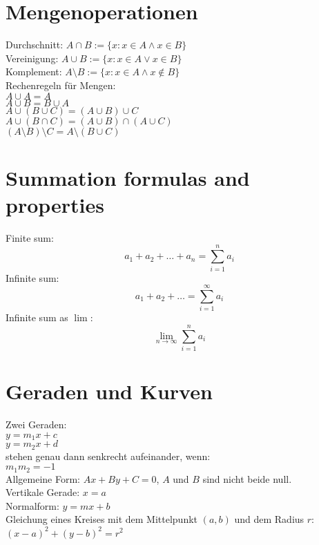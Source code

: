 \documentclass[a4paper, 10pt]{scrartcl}
\begin{document}
\setlength{\parindent}{0em}

\section*{Mengenoperationen}
Durchschnitt: $A\cap B := \{x: x\in A \wedge x\in B\}$\\
Vereinigung: $A\cup B := \{x: x\in A \vee x\in B\}$\\
Komplement: $A\setminus B := \{x: x\in A \wedge x\notin B\}$\\

Rechenregeln für Mengen:\\
$A\cup A = A$\\
$A\cup B = B\cup A$\\
$A\cup (B\cup C) = (A\cup B)\cup C$\\
$A\cup (B\cap C) = (A\cup B)\cap (A\cup C)$\\
$(A\setminus B)\setminus C = A\setminus (B\cup C)$\\

\section*{Summation formulas and properties}
Finite sum:
\[
a_{1} + a_{2} + \dots + a_{n} = \sum_{i=1}^{n}a_{i}
\]
Infinite sum:
\[
a_{1} + a_{2} + \dots = \sum_{i=1}^{\infty}a_{i}
\]
Infinite sum as $\lim$:\\
\[
\lim_{n\to\infty}\sum_{i=1}^{n}a_{i}
\]

\section*{Geraden und Kurven}
Zwei Geraden:\\
$y = m_{1}x + c$\\
$y = m_{2}x + d$\\
stehen genau dann senkrecht aufeinander, wenn:\\
$m_{1}m_{2} = -1$\\

Allgemeine Form: $Ax + By + C = 0$, $A$ und $B$ sind nicht beide null.\\
Vertikale Gerade: $x = a$\\
Normalform: $y = mx + b$\\

Gleichung eines Kreises mit dem Mittelpunkt $(a, b)$
und dem Radius $r$:\\
$(x - a)^{2} + (y - b)^{2} = r^{2}$\\
\end{document}
